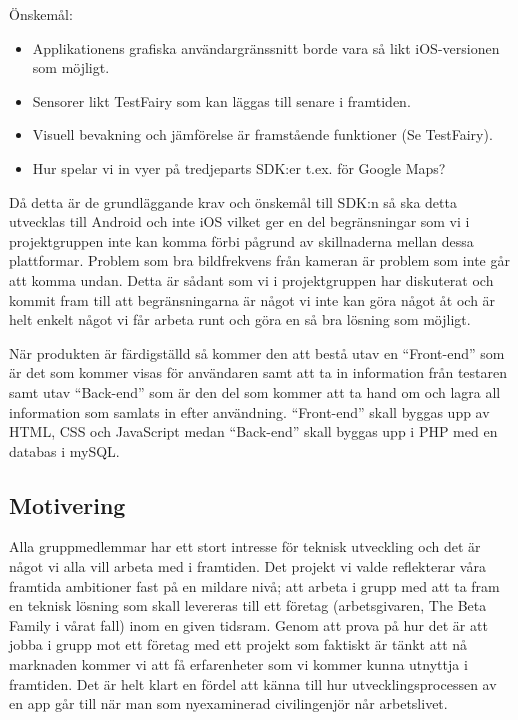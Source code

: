 Önskemål:

\begin{itemize}
	\item Applikationens grafiska användargränssnitt borde vara så likt iOS-versionen som möjligt.
	\item Sensorer likt TestFairy som kan läggas till senare i framtiden.
	\item Visuell bevakning och jämförelse är framstående funktioner (Se TestFairy).
	\item Hur spelar vi in vyer på tredjeparts SDK:er t.ex. för Google Maps?
\end{itemize}


Då detta är de grundläggande krav och önskemål till SDK:n så ska detta utvecklas till Android och inte iOS vilket ger en del begränsningar som vi i projektgruppen inte kan komma förbi pågrund av skillnaderna mellan dessa plattformar. Problem som bra bildfrekvens från kameran är problem som inte går att komma undan. Detta är sådant som vi i projektgruppen har diskuterat och kommit fram till att begränsningarna är något vi inte kan göra något åt och är helt enkelt något vi får arbeta runt och göra en så bra lösning som möjligt.


När produkten är färdigställd så kommer den att bestå utav en “Front-end” som är det som kommer visas för användaren samt att ta in information från testaren samt utav “Back-end” som är den del som kommer att ta hand om och lagra all information som samlats in efter användning. “Front-end” skall byggas upp av HTML, CSS och JavaScript medan “Back-end” skall byggas upp i PHP med en databas i mySQL. \parencite{catalog}

\subsection{Motivering}
Alla gruppmedlemmar har ett stort intresse för teknisk utveckling och det är något vi alla vill arbeta med i framtiden. Det projekt vi valde reflekterar våra framtida ambitioner fast på en mildare nivå; att arbeta i grupp med att ta fram en teknisk lösning som skall levereras till ett företag (arbetsgivaren, The Beta Family i vårat fall) inom en given tidsram. Genom att prova på hur det är att jobba i grupp mot ett företag med ett projekt som faktiskt är tänkt att nå marknaden kommer vi att få erfarenheter som vi kommer kunna utnyttja i framtiden. Det är helt klart en fördel att känna till hur utvecklingsprocessen av en app går till när man som nyexaminerad civilingenjör når arbetslivet.

